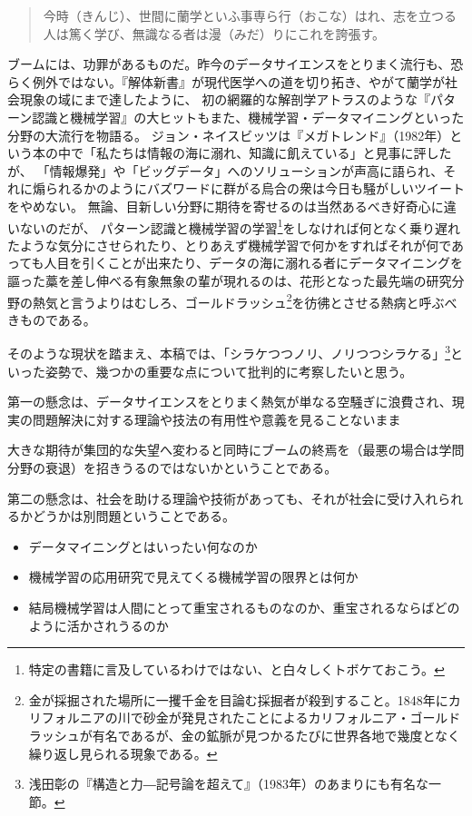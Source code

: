 \begin{quote}
今時（きんじ）、世間に蘭学といふ事専ら行（おこな）はれ、志を立つる人は篤く学び、無識なる者は漫（みだ）りにこれを誇張す。
\end{quote}

ブームには、功罪があるものだ。昨今のデータサイエンスをとりまく流行も、恐らく例外ではない。『解体新書』が現代医学への道を切り拓き、やがて蘭学が社会現象の域にまで達したように、
初の網羅的な解剖学アトラスのような『パターン認識と機械学習』の大ヒットもまた、機械学習・データマイニングといった分野の大流行を物語る。
ジョン・ネイスビッツは『メガトレンド』（1982年）という本の中で「私たちは情報の海に溺れ、知識に飢えている」と見事に評したが、
「情報爆発」や「ビッグデータ」へのソリューションが声高に語られ、それに煽られるかのようにバズワードに群がる烏合の衆は今日も騒がしいツイートをやめない。
無論、目新しい分野に期待を寄せるのは当然あるべき好奇心に違いないのだが、
パターン認識と機械学習の学習\footnote{特定の書籍に言及しているわけではない、と白々しくトボケておこう。}をしなければ何となく乗り遅れたような気分にさせられたり、とりあえず機械学習で何かをすればそれが何であっても人目を引くことが出来たり、データの海に溺れる者にデータマイニングを謳った藁を差し伸べる有象無象の輩が現れるのは、花形となった最先端の研究分野の熱気と言うよりはむしろ、ゴールドラッシュ\footnote{金が採掘された場所に一攫千金を目論む採掘者が殺到すること。1848年にカリフォルニアの川で砂金が発見されたことによるカリフォルニア・ゴールドラッシュが有名であるが、金の鉱脈が見つかるたびに世界各地で幾度となく繰り返し見られる現象である。}を彷彿とさせる熱病と呼ぶべきものである。

そのような現状を踏まえ、本稿では、「シラケつつノリ、ノリつつシラケる」\footnote{浅田彰の『構造と力―記号論を超えて』（1983年）のあまりにも有名な一節。}といった姿勢で、幾つかの重要な点について批判的に考察したいと思う。

第一の懸念は、データサイエンスをとりまく熱気が単なる空騒ぎに浪費され、現実の問題解決に対する理論や技法の有用性や意義を見ることないまま

大きな期待が集団的な失望へ変わると同時にブームの終焉を（最悪の場合は学問分野の衰退）を招きうるのではないかということである。

第二の懸念は、社会を助ける理論や技術があっても、それが社会に受け入れられるかどうかは別問題ということである。
\begin{itemize}
\item データマイニングとはいったい何なのか
\item 機械学習の応用研究で見えてくる機械学習の限界とは何か
\item 結局機械学習は人間にとって重宝されるものなのか、重宝されるならばどのように活かされうるのか
\end{itemize}